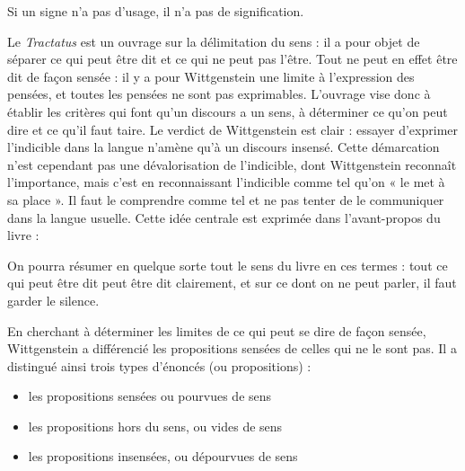 \begin{lecture}{}
Si un signe n’a pas d’usage, il n’a pas de signification.
\end{lecture}

Le \textit{Tractatus} est un ouvrage sur la délimitation du sens : il a pour objet de séparer ce qui peut être dit et ce qui ne peut pas l’être. Tout ne peut en effet être dit de façon sensée : il y a pour Wittgenstein une limite à l’expression des pensées, et toutes les pensées ne sont pas exprimables. L’ouvrage vise donc à établir les critères qui font qu’un discours a un sens, à déterminer ce qu’on peut dire et ce qu’il faut taire. Le verdict de Wittgenstein est clair : essayer d’exprimer l’indicible dans la langue n’amène qu’à un discours insensé. Cette démarcation n’est cependant pas une dévalorisation de l’indicible, dont Wittgenstein reconnaît l’importance, mais c’est en reconnaissant l’indicible comme tel qu’on « le met à sa place ». Il faut le comprendre comme tel et ne pas tenter de le communiquer dans la langue usuelle. Cette idée centrale est exprimée dans l’avant-propos du livre :

\begin{lecture}{}
On pourra résumer en quelque sorte tout le sens du livre en ces termes : tout ce qui peut être dit peut être dit clairement, et sur ce dont on ne peut parler, il faut garder le silence.
\end{lecture}

En cherchant à déterminer les limites de ce qui peut se dire de façon sensée, Wittgenstein a différencié les propositions sensées de celles qui ne le sont pas. Il a distingué ainsi trois types d’énoncés (ou propositions) :
\begin{itemize}
\item les propositions sensées ou pourvues de sens
\item les propositions hors du sens, ou vides de sens
\item les propositions insensées, ou dépourvues de sens
\end{itemize}

